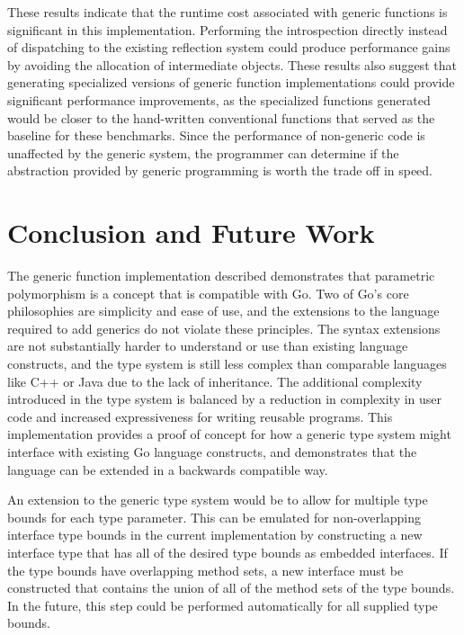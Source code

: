\documentclass[letterpaper,11pt]{article}
\begin{document}
These results indicate that the runtime cost associated with generic functions is significant in this implementation. Performing the introspection directly instead of dispatching to the existing reflection system could produce performance gains by avoiding the allocation of intermediate objects. These results also suggest that generating specialized versions of generic function implementations could provide significant performance improvements, as the specialized functions generated would be closer to the hand-written conventional functions that served as the baseline for these benchmarks. Since the performance of non-generic code is unaffected by the generic system, the programmer can determine if the abstraction provided by generic programming is worth the trade off in speed.

\section{Conclusion and Future Work} \label{conclusion}

The generic function implementation described demonstrates that parametric polymorphism is a concept that is compatible with Go. Two of Go's core philosophies are simplicity and ease of use, and the extensions to the language required to add generics do not violate these principles. The syntax extensions are not substantially harder to understand or use than existing language constructs, and the type system is still less complex than comparable languages like C++ or Java due to the lack of inheritance. The additional complexity introduced in the type system is balanced by a reduction in complexity in user code and increased expressiveness for writing reusable programs. This implementation provides a proof of concept for how a generic type system might interface with existing Go language constructs, and demonstrates that the language can be extended in a backwards compatible way.

An extension to the generic type system would be to allow for multiple type bounds for each type parameter. This can be emulated for non-overlapping interface type bounds in the current implementation by constructing a new interface type that has all of the desired type bounds as embedded interfaces. If the type bounds have overlapping method sets, a new interface must be constructed that contains the union of all of the method sets of the type bounds. In the future, this step could be performed automatically for all supplied type bounds. 
\end{document}

